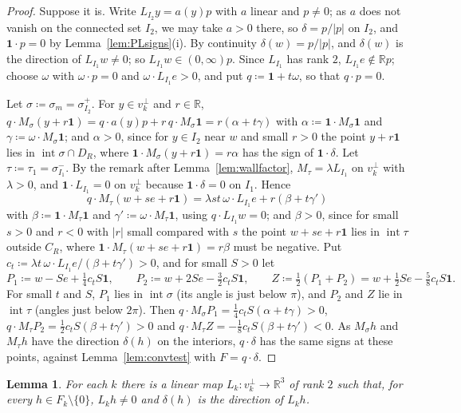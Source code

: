 \documentclass[11pt]{article}
\newcommand{\R}{\mathbb{R}}
\newcommand{\one}{\mathbf{1}}
\DeclareMathOperator{\inter}{int}
\theoremstyle{plain}
\newtheorem{lemma}[theorem]{Lemma}
\theoremstyle{definition}
\theoremstyle{remark}
\begin{document}
\begin{proof}
Suppose it is. Write $L_{I_2}y=a(y)p$ with $a$ linear and $p\ne0$; as $a$ does not vanish
on the connected set $I_2$, we may take $a>0$ there, so $\delta=p/|p|$ on $I_2$, and
$\one\cdot p=0$ by Lemma~\ref{lem:PLsigns}(i). By continuity $\delta(w)=p/|p|$, and
$\delta(w)$ is the direction of $L_{I_1}w\ne0$; so $L_{I_1}w\in(0,\infty)p$. Since
$L_{I_1}$ has rank $2$, $L_{I_1}e\notin\R p$; choose $\omega$ with $\omega\cdot p=0$ and
$\omega\cdot L_{I_1}e>0$, and put $q\coloneqq\one+t\omega$, so that $q\cdot p=0$.

Let $\sigma\coloneqq\sigma_m=\sigma^+_{I_2}$. For $y\in v_k^\perp$ and $r\in\R$,
$q\cdot M_\sigma(y+r\one)=q\cdot a(y)p+r\,q\cdot M_\sigma\one=r(\alpha+t\gamma)$ with
$\alpha\coloneqq\one\cdot M_\sigma\one$ and $\gamma\coloneqq\omega\cdot M_\sigma\one$; and
$\alpha>0$, since for $y\in I_2$ near $w$ and small $r>0$ the point $y+r\one$ lies in
$\inter\sigma\cap D_R$, where $\one\cdot M_\sigma(y+r\one)=r\alpha$ has the sign of
$\one\cdot\delta$. Let
$\tau\coloneqq\tau_1=\sigma^-_{I_1}$. By the remark after Lemma~\ref{lem:wallfactor},
$M_\tau=\lambda L_{I_1}$ on $v_k^\perp$ with $\lambda>0$, and $\one\cdot L_{I_1}=0$ on
$v_k^\perp$ because $\one\cdot\delta=0$ on $I_1$. Hence
\[
  q\cdot M_\tau(w+se+r\one)=\lambda st\,\omega\cdot L_{I_1}e+r(\beta+t\gamma')
\]
with $\beta\coloneqq\one\cdot M_\tau\one$ and $\gamma'\coloneqq\omega\cdot M_\tau\one$, using
$q\cdot L_{I_1}w=0$; and $\beta>0$, since for small $s>0$ and $r<0$ with $|r|$ small
compared with $s$ the point $w+se+r\one$ lies in $\inter\tau$ outside $C_R$, where
$\one\cdot M_\tau(w+se+r\one)=r\beta$ must be negative. Put $c_t\coloneqq
\lambda t\,\omega\cdot L_{I_1}e/(\beta+t\gamma')>0$, and for small $S>0$ let
\[
  P_1\coloneqq w-Se+\tfrac14c_tS\one,\qquad P_2\coloneqq w+2Se-\tfrac32c_tS\one,\qquad
  Z\coloneqq\tfrac12(P_1+P_2)=w+\tfrac12Se-\tfrac58c_tS\one .
\]
For small $t$ and $S$, $P_1$ lies in $\inter\sigma$ (its angle is just below $\pi$), and
$P_2$ and $Z$ lie in $\inter\tau$ (angles just below $2\pi$). Then $q\cdot M_\sigma P_1=
\frac14c_tS(\alpha+t\gamma)>0$, $q\cdot M_\tau P_2=\frac12c_tS(\beta+t\gamma')>0$ and
$q\cdot M_\tau Z=-\frac18c_tS(\beta+t\gamma')<0$. As $M_\sigma h$ and $M_\tau h$ have the
direction $\delta(h)$ on the interiors, $q\cdot\delta$ has the same signs at these points,
against Lemma~\ref{lem:convtest} with $F=q\cdot\delta$.
\end{proof}

\begin{lemma}\label{lem:facetmap}
For each $k$ there is a linear map $L_k:v_k^\perp\to\R^3$ of rank $2$ such that, for every
$h\in F_k\setminus\{0\}$, $L_kh\ne0$ and $\delta(h)$ is the direction of $L_kh$.
\end{lemma}
\end{document}
